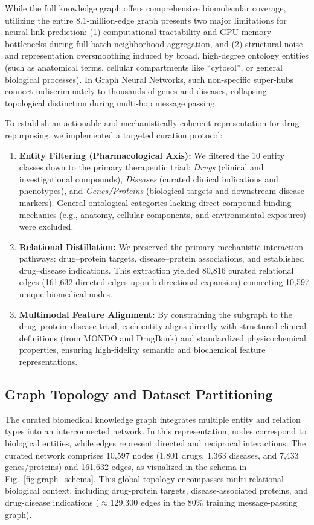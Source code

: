 \documentclass[conference,a4paper]{IEEEtran}
\begin{document}
While the full knowledge graph offers comprehensive biomolecular coverage, utilizing the entire 8.1-million-edge graph presents two major limitations for neural link prediction: (1) computational tractability and GPU memory bottlenecks during full-batch neighborhood aggregation, and (2) structural noise and representation oversmoothing induced by broad, high-degree ontology entities (such as anatomical terms, cellular compartments like ``cytosol'', or general biological processes). In Graph Neural Networks, such non-specific super-hubs connect indiscriminately to thousands of genes and diseases, collapsing topological distinction during multi-hop message passing.

To establish an actionable and mechanistically coherent representation for drug repurposing, we implemented a targeted curation protocol:
\begin{enumerate}
    \item \textbf{Entity Filtering (Pharmacological Axis):} We filtered the 10 entity classes down to the primary therapeutic triad: \textit{Drugs} (clinical and investigational compounds), \textit{Diseases} (curated clinical indications and phenotypes), and \textit{Genes/Proteins} (biological targets and downstream disease markers). General ontological categories lacking direct compound-binding mechanics (e.g., anatomy, cellular components, and environmental exposures) were excluded.
    \item \textbf{Relational Distillation:} We preserved the primary mechanistic interaction pathways: drug--protein targets, disease--protein associations, and established drug--disease indications. This extraction yielded 80,816 curated relational edges (161,632 directed edges upon bidirectional expansion) connecting 10,597 unique biomedical nodes.
    \item \textbf{Multimodal Feature Alignment:} By constraining the subgraph to the drug--protein--disease triad, each entity aligns directly with structured clinical definitions (from MONDO and DrugBank) and standardized physicochemical properties, ensuring high-fidelity semantic and biochemical feature representations.
\end{enumerate}

\subsection{Graph Topology and Dataset Partitioning}
The curated biomedical knowledge graph integrates multiple entity and relation types into an interconnected network. In this representation, nodes correspond to biological entities, while edges represent directed and reciprocal interactions. The curated network comprises 10,597 nodes (1,801 drugs, 1,363 diseases, and 7,433 genes/proteins) and 161,632 edges, as visualized in the schema in Fig.~\ref{fig:graph_schema}. This global topology encompasses multi-relational biological context, including drug-protein targets, disease-associated proteins, and drug-disease indications ($\approx$129,300 edges in the 80\% training message-passing graph).
\end{document}
